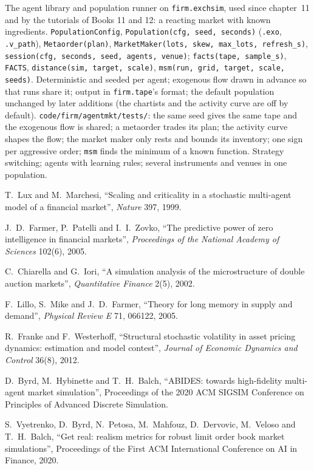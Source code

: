 \begin{build}
 The agent library and population runner on \texttt{firm.exchsim}, used since chapter~11 and by the tutorials of Books 11 and 12: a
reacting market with known ingredients.
 \texttt{PopulationConfig}, \texttt{Population(cfg, seed, seconds)} (\texttt{.exo}, \texttt{.v\_path}), \texttt{Metaorder(plan)},
\texttt{MarketMaker(lots, skew, max\_lots, refresh\_s)}, \texttt{session(cfg, seconds, seed, agents, venue)}; \texttt{facts(tape, sample\_s)},
\texttt{FACTS}, \texttt{distance(sim, target, scale)}, \texttt{msm(run, grid, target, scale, seeds)}.
 Deterministic and seeded per agent; exogenous flow drawn in advance so that runs share it; output in \texttt{firm.tape}'s format; the
default population unchanged by later additions (the chartists and the activity curve are off by default).
 \texttt{code/firm/agentmkt/tests/}: the same seed gives the same tape and the exogenous flow is shared; a metaorder trades its
plan; the activity curve shapes the flow; the market maker only rests and bounds its inventory; one sign per aggressive order; \texttt{msm} finds the
minimum of a known function.
 Strategy switching; agents with learning rules; several instruments and venues in one population.
\end{build}

\begin{omsources}
\item T.~Lux and M.~Marchesi, ``Scaling and criticality in a stochastic multi-agent model of a financial market'', \emph{Nature} 397, 1999.
\item J.~D.~Farmer, P.~Patelli and I.~I.~Zovko, ``The predictive power of zero intelligence in financial markets'', \emph{Proceedings of the National
Academy of Sciences} 102(6), 2005.
\item C.~Chiarella and G.~Iori, ``A simulation analysis of the microstructure of double auction markets'', \emph{Quantitative Finance} 2(5), 2002.
\item F.~Lillo, S.~Mike and J.~D.~Farmer, ``Theory for long memory in supply and demand'', \emph{Physical Review E} 71, 066122, 2005.
\item R.~Franke and F.~Westerhoff, ``Structural stochastic volatility in asset pricing dynamics: estimation and model contest'', \emph{Journal of
Economic Dynamics and Control} 36(8), 2012.
\item D.~Byrd, M.~Hybinette and T.~H.~Balch, ``ABIDES: towards high-fidelity multi-agent market simulation'', Proceedings of the 2020 ACM SIGSIM
Conference on Principles of Advanced Discrete Simulation.
\item S.~Vyetrenko, D.~Byrd, N.~Petosa, M.~Mahfouz, D.~Dervovic, M.~Veloso and T.~H.~Balch, ``Get real: realism metrics for robust limit order book
market simulations'', Proceedings of the First ACM International Conference on AI in Finance, 2020.
\end{omsources}

